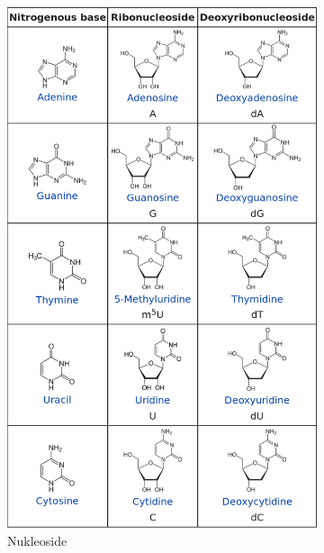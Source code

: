\documentclass[a4paper,twocolumn,usegeometry,english,fontsize=6,DIV=16]{scrartcl}
\begin{document}
\begin{figure}
	\centering
	\begin{subfigure}{.5\linewidth}
		\centering
		\includegraphics[width=\linewidth]{img/nukleoside.png}
		\caption{Nukleoside}
	\end{subfigure}%
	\begin{subfigure}{.5\linewidth}
		\centering

\end{subfigure}
\end{figure}
\end{document}
